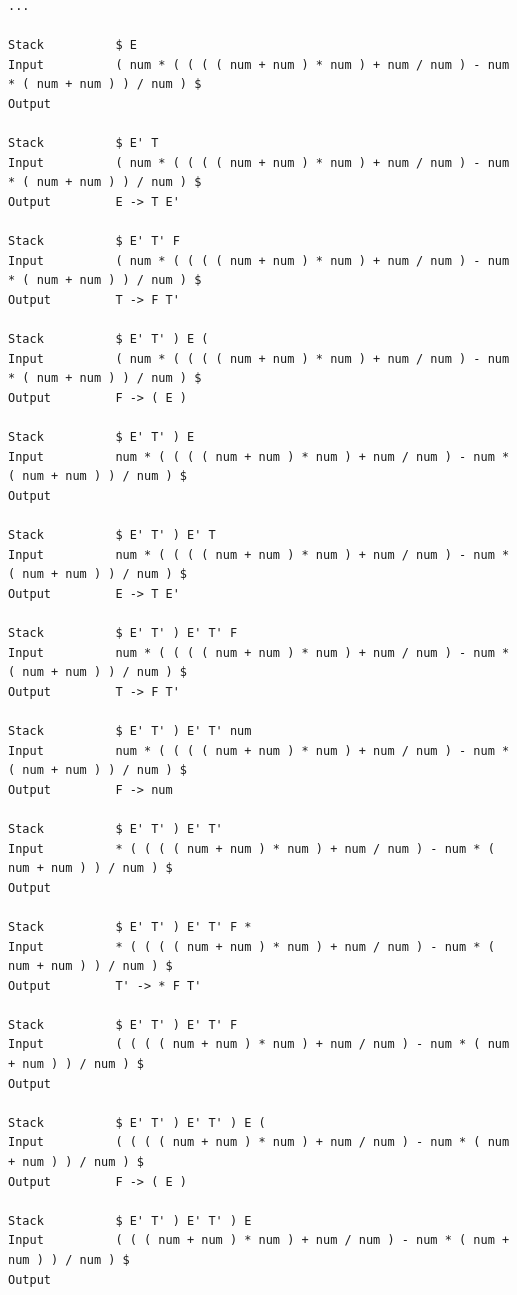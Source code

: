 \documentclass[lang=cn,11pt,a4paper,cite=authornum]{paper}
\begin{document}
\begin{code}
\begin{verbatim}
...

Stack          $ E 
Input          ( num * ( ( ( ( num + num ) * num ) + num / num ) - num * ( num + num ) ) / num ) $ 
Output          

Stack          $ E' T 
Input          ( num * ( ( ( ( num + num ) * num ) + num / num ) - num * ( num + num ) ) / num ) $ 
Output         E -> T E' 

Stack          $ E' T' F 
Input          ( num * ( ( ( ( num + num ) * num ) + num / num ) - num * ( num + num ) ) / num ) $ 
Output         T -> F T' 

Stack          $ E' T' ) E ( 
Input          ( num * ( ( ( ( num + num ) * num ) + num / num ) - num * ( num + num ) ) / num ) $ 
Output         F -> ( E ) 

Stack          $ E' T' ) E 
Input          num * ( ( ( ( num + num ) * num ) + num / num ) - num * ( num + num ) ) / num ) $ 
Output         

Stack          $ E' T' ) E' T 
Input          num * ( ( ( ( num + num ) * num ) + num / num ) - num * ( num + num ) ) / num ) $ 
Output         E -> T E' 

Stack          $ E' T' ) E' T' F 
Input          num * ( ( ( ( num + num ) * num ) + num / num ) - num * ( num + num ) ) / num ) $ 
Output         T -> F T' 

Stack          $ E' T' ) E' T' num 
Input          num * ( ( ( ( num + num ) * num ) + num / num ) - num * ( num + num ) ) / num ) $ 
Output         F -> num 

Stack          $ E' T' ) E' T' 
Input          * ( ( ( ( num + num ) * num ) + num / num ) - num * ( num + num ) ) / num ) $ 
Output         

Stack          $ E' T' ) E' T' F * 
Input          * ( ( ( ( num + num ) * num ) + num / num ) - num * ( num + num ) ) / num ) $ 
Output         T' -> * F T' 

Stack          $ E' T' ) E' T' F 
Input          ( ( ( ( num + num ) * num ) + num / num ) - num * ( num + num ) ) / num ) $ 
Output         

Stack          $ E' T' ) E' T' ) E ( 
Input          ( ( ( ( num + num ) * num ) + num / num ) - num * ( num + num ) ) / num ) $ 
Output         F -> ( E ) 

Stack          $ E' T' ) E' T' ) E 
Input          ( ( ( num + num ) * num ) + num / num ) - num * ( num + num ) ) / num ) $ 
Output         


\end{verbatim}
\end{code}
\end{document}
